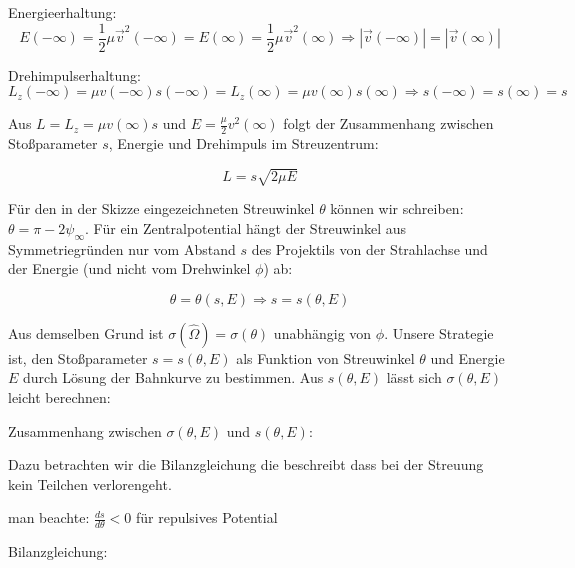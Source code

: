 \documentclass[10pt, letterpaper]{article}
\begin{document}
Energieerhaltung:
\[
E(-\infty) = \frac{1}{2}\mu\vec{v}^2(-\infty) = E(\infty) = \frac{1}{2}\mu\vec{v}^2(\infty) \Rightarrow |\vec{v}(-\infty)| = |\vec{v}(\infty)|
\]

Drehimpulserhaltung:
\[
L_z(-\infty) = \mu v(-\infty)s(-\infty) = L_z(\infty) = \mu v(\infty)s(\infty) \Rightarrow s(-\infty) = s(\infty) = s
\]

Aus $L=L_z = \mu v(\infty)s$ und $E = \frac{\mu}{2}v^2(\infty)$ folgt der Zusammenhang zwischen Stoßparameter $s$, Energie und Drehimpuls im Streuzentrum:

\[
L = s\sqrt{2\mu E}
\]

Für den in der Skizze eingezeichneten Streuwinkel $\theta$ können wir schreiben:
$\theta = \pi - 2\psi_{\infty}$. Für ein Zentralpotential hängt der Streuwinkel aus Symmetriegründen nur vom Abstand $s$ des Projektils von der Strahlachse und der Energie (und nicht vom Drehwinkel $\phi$) ab:

\[
\theta = \theta(s,E) \Rightarrow s = s(\theta,E)
\]

Aus demselben Grund ist $\sigma(\hat{\Omega}) = \sigma(\theta)$ unabhängig von $\phi$. 
Unsere Strategie ist, den Stoßparameter $s = s(\theta,E)$ als Funktion von Streuwinkel $\theta$ und Energie $E$ durch Lösung der Bahnkurve zu bestimmen. Aus $s(\theta,E)$ lässt sich $\sigma(\theta,E)$ leicht berechnen:


Zusammenhang zwischen $\sigma(\theta,E)$ und $s(\theta,E)$:

Dazu betrachten wir die Bilanzgleichung die beschreibt dass bei der Streuung kein Teilchen verlorengeht.

\begin{center}
\end{center}

man beachte: $\frac{ds}{d\theta} < 0$ für repulsives Potential

Bilanzgleichung:
\end{document}
